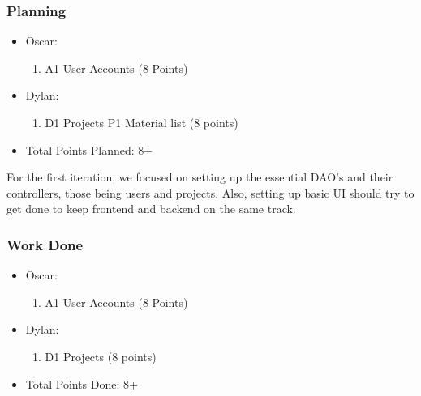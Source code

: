 \documentclass{article}
\begin{document}
\subsubsection{Planning}
\begin{itemize}
    \item Oscar:
        \begin{enumerate}
            \item A1 User Accounts (8 Points)
        \end{enumerate}

        \item Dylan:
            \begin{enumerate}
                \item D1 Projects P1 Material list (8 points)
            \end{enumerate}

    \item Total Points Planned: 8+
\end{itemize}

For the first iteration, we focused on setting up the essential DAO's and their controllers, those being users and projects. Also, setting up basic UI should try to get done to keep frontend and backend on the same track. 


\subsubsection{Work Done}

\begin{itemize}
    \item Oscar:
        \begin{enumerate}
            \item A1 User Accounts (8 Points)
        \end{enumerate}

        \item Dylan:
            \begin{enumerate}
                \item D1 Projects (8 points)
            \end{enumerate}

    \item Total Points Done: 8+
\end{itemize}
\end{document}

